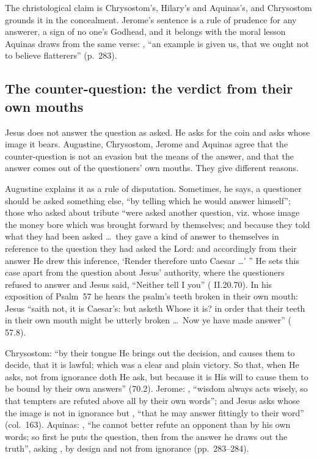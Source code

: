 The christological claim is Chrysostom's, Hilary's and Aquinas's, and
Chrysostom grounds it in the concealment. Jerome's sentence is a rule of
prudence for any answerer, a sign of no one's Godhead, and it belongs with the
moral lesson Aquinas draws from the same verse: , ``an example is given us, that we ought not to believe flatterers''
(p.~283).

\subsection{The counter-question: the verdict from their own mouths}

Jesus does not answer the question as asked. He asks for the coin and asks
whose image it bears. Augustine, Chrysostom, Jerome and Aquinas agree that the
counter-question is not an evasion but the means of the answer, and that the
answer comes out of the questioners' own mouths. They give different reasons.

Augustine explains it as a rule of disputation. Sometimes, he says, a
questioner should be asked something else, ``by telling which he would answer
himself''; those who asked about tribute ``were asked another question, viz.
whose image the money bore which was brought forward by themselves; and
because they told what they had been asked \ldots\ they gave a kind of answer
to themselves in reference to the question they had asked the Lord: and
accordingly from their answer He drew this inference, `Render therefore unto
Caesar \ldots' '' He sets this case apart from the question about Jesus'
authority, where the questioners refused to answer and Jesus said, ``Neither
tell I you'' ( II.20.70). In his exposition
of Psalm~57 he hears the psalm's teeth broken in their own mouth: Jesus ``saith
not, it is Caesar's: but asketh Whose it is? in order that their teeth in their
own mouth might be utterly broken \ldots\ Now ye have made answer''
( 57.8).

Chrysostom: ``by their tongue He brings out the decision, and causes them to
decide, that it is lawful; which was a clear and plain victory. So that, when
He asks, not from ignorance doth He ask, but because it is His will to cause
them to be bound by their own answers'' (70.2). Jerome: ,
``wisdom always acts wisely, so that tempters are refuted above all by their
own words''; and Jesus asks whose the image is not in ignorance but , ``that he may answer fittingly to
their word'' (col.~163). Aquinas: , ``he cannot better refute an opponent than by
his own words; so first he puts the question, then from the answer he draws
out the truth'', asking , by design and not from
ignorance (pp.~283--284).

